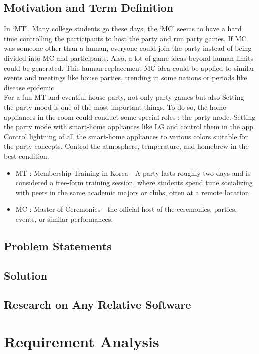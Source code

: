 \documentclass[conference]{IEEEtran}
\begin{document}
    \subsection{Motivation and Term Definition}
        In ‘MT’,  Many college students go these days, the ‘MC’ seems to have a hard time controlling the participants to host the party and run party games. If MC was someone other than a human, everyone could join the party instead of being divided into MC and participants. Also, a lot of game ideas beyond human limits could be generated. This human replacement MC idea could be applied to similar events and meetings like house parties, trending in some nations or periods like disease epidemic.\\
    	For a fun MT and eventful house party, not only party games but also Setting the party mood is one of the most important things. To do so, the home appliances in the room could conduct some special roles : the party mode. Setting the party mode with  smart-home appliances like LG and control them in the app. Control lightning of all the smart-home appliances to various colors suitable for the party concepts. Control the atmosphere, temperature, and homebrew in the best condition.
        \begin{itemize}
            \item MT :  Membership Training in Korea - A party lasts roughly two days and is considered a free-form training session, where students spend time socializing with peers in the same academic majors or clubs, often at a remote location.
            \item MC : Master of Ceremonies - the official host of the ceremonies, parties, events, or similar performances.
        \end{itemize}

    \subsection{Problem Statements}
    \subsection{Solution}
    \subsection{Research on Any Relative Software}
    
    \section{Requirement Analysis}
    
\end{document}
